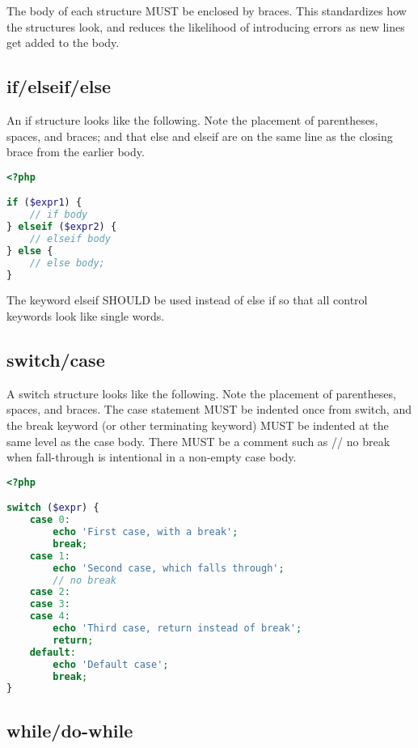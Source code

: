 The body of each structure MUST be enclosed by braces. This standardizes how the structures look, and reduces the likelihood of introducing errors as new lines get added to the body.

\subsection{if/elseif/else}


An if structure looks like the following. Note the placement of parentheses, spaces, and braces; and that else and elseif are on the same line as the closing brace from the earlier body.





\begin{lstlisting}[language=PHP]
<?php

if ($expr1) {
    // if body
} elseif ($expr2) {
    // elseif body
} else {
    // else body;
}
\end{lstlisting}



The keyword elseif SHOULD be used instead of else if so that all control keywords look like single words.


\subsection{switch/case}

A switch structure looks like the following. Note the placement of parentheses, spaces, and braces. The case statement MUST be indented once from switch, and the break keyword (or other terminating keyword) MUST be indented at the same level as the case body. There MUST be a comment such as // no break when fall-through is intentional in a non-empty case body.




\begin{lstlisting}[language=PHP]
<?php

switch ($expr) {
    case 0:
        echo 'First case, with a break';
        break;
    case 1:
        echo 'Second case, which falls through';
        // no break
    case 2:
    case 3:
    case 4:
        echo 'Third case, return instead of break';
        return;
    default:
        echo 'Default case';
        break;
}
\end{lstlisting}


\subsection{while/do-while}

